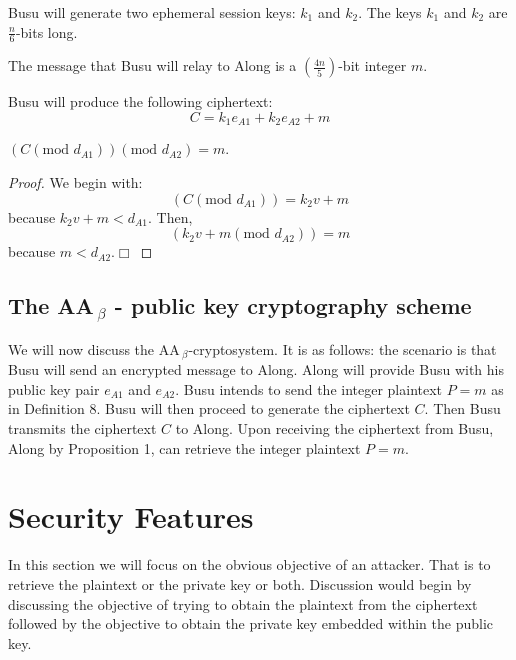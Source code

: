 \documentclass{llncs}
\begin{document}
\begin{definition}
Busu will generate two ephemeral session keys: $k_{1}$ and
$k_{2}$. The keys $k_{1}$ and $k_{2}$ are $\frac{n}{6}$-bits long.
\end{definition}

\begin{definition}
The message that Busu will relay to Along is a
$(\frac{4n}{5})$-bit integer $m$.
\end{definition}

\begin{definition}
Busu will produce the following ciphertext:
\begin{equation}
C=k_{1}e_{A1}+k_{2}e_{A2}+m
\end{equation}
\end{definition}

\begin{proposition}
$(C(\textrm{mod } d_{A1}))(\textrm{mod } d_{A2})=m$.
\end{proposition}

\begin{proof}
We begin with:
\begin{equation}
(C(\textrm{mod } d_{A1}))=k_{2}v+m
\end{equation}
because $k_{2}v+m<d_{A1}$. Then,
\begin{equation}
(k_{2}v+m(\textrm{mod } d_{A2}))=m
\end{equation}
because $m<d_{A2}$.$\Box$
\end{proof}

\subsection{The AA\,$_{\beta}$ - public key cryptography scheme}
We will now discuss the AA\,$_{\beta}$-cryptosystem. It is as
follows: the scenario is that Busu will send an encrypted message
to Along. Along will provide Busu with his public key pair
$e_{A1}$ and $e_{A2}$. Busu intends to send the integer plaintext
$P=m$ as in Definition 8. Busu will then proceed to generate the
ciphertext $C$. Then Busu transmits the ciphertext $C$ to Along.
Upon receiving the ciphertext from Busu, Along by Proposition 1,
can retrieve the integer plaintext $P=m$.

\section{Security Features}
In this section we will focus on the obvious objective of an
attacker. That is to retrieve the plaintext or the private key or
both. Discussion would begin by discussing the objective of trying
to obtain the plaintext from the ciphertext followed by the
objective to obtain the private key embedded within the public
key.
\end{document}

